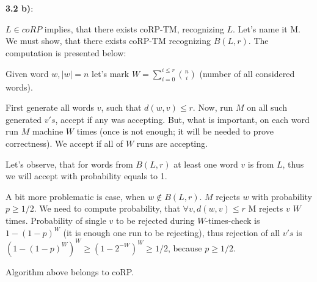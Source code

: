 \documentclass[12pt]{article}
\begin{document}
\textbf{3.2 b)}:

$L \in coRP$ implies, that there exists coRP-TM, recognizing $L$. Let's name it M. We must show, that there exists coRP-TM recognizing $B(L, r)$. 
The computation is presented below:

Given word $w, \rvert w\rvert = n$ let's mark $W = \sum_{i = 0}^{i \leq r} {\binom{n}{i}}$ (number of all considered words).

First generate all words $v$, such that $d(w,v) \leq r$.
Now, run $M$ on all such generated $v's$, accept if any was accepting. But, what is important, on each word run $M$ machine $ W$ times (once is not enough; it will be needed to prove correctness). We accept if all of $W$ runs are accepting. 

Let's observe, that for words from $B(L, r)$ at least one word $v$ is from $L$, thus we will accept with probability equals to 1.

A bit more problematic is case, when $w \notin B(L, r)$. $M$ rejects $w$ with probability $p \geq 1/2$. We need to compute probability, that $\forall{v, d(w,v) \leq r}$ M rejects $v$ $W$ times. Probability of single $v$ to be rejected during $W$-times-check is $1 - (1-p)^W$ (it is enough one run to be rejecting), thus rejection of all $v's$ is $(1 - (1 - p)^W)^W \geq (1 - 2^{-W})^W \geq 1/2$, because $p \geq 1/2$.

Algorithm above belongs to coRP.
\end{document}
